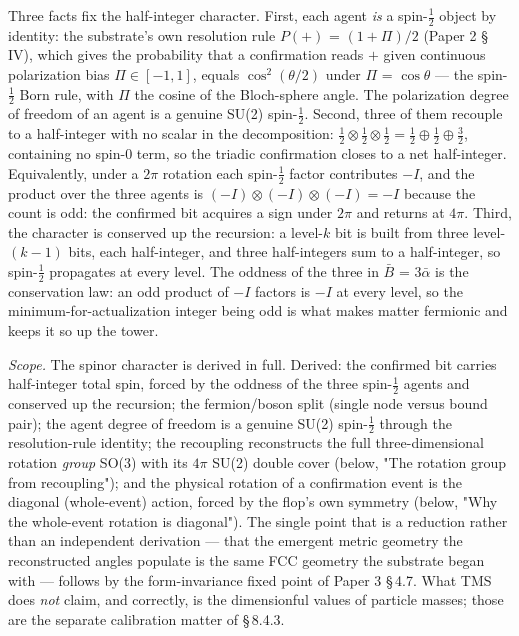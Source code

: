 \documentclass[11pt,oneside]{report}
\theoremstyle{definition}
\theoremstyle{remark}
\begin{document}
Three facts fix the half-integer character. First, each agent \emph{is}
a spin-\ensuremath{\tfrac{1}{2}} object by identity: the substrate's own resolution rule
\ensuremath{P(+)} = \ensuremath{(1 + \Pi)/2} (Paper 2 \S\,IV), which gives the probability that a
confirmation reads \ensuremath{+} given continuous polarization bias
\ensuremath{\Pi \in [-1, 1]}, equals \ensuremath{\cos^2(\theta/2)} under \ensuremath{\Pi} = \ensuremath{\cos\theta} --- the
spin-\ensuremath{\tfrac{1}{2}} Born rule, with \ensuremath{\Pi} the cosine of the Bloch-sphere angle. The
polarization degree of freedom of an agent is a genuine SU(2) spin-\ensuremath{\tfrac{1}{2}}.
Second, three of them recouple to a half-integer with no scalar in the
decomposition: \ensuremath{\tfrac{1}{2} \otimes \tfrac{1}{2} \otimes \tfrac{1}{2} = \tfrac{1}{2} \oplus \tfrac{1}{2} \oplus \tfrac{3}{2}},
containing no spin-0 term, so the triadic confirmation closes to a net
half-integer. Equivalently, under a \ensuremath{2\pi} rotation each spin-\ensuremath{\tfrac{1}{2}} factor
contributes \ensuremath{-I}, and the product over the three agents is
\ensuremath{(-I)\otimes(-I)\otimes(-I) = -I} because the count is odd: the confirmed bit
acquires a sign under \ensuremath{2\pi} and returns at \ensuremath{4\pi}. Third, the character is
conserved up the recursion: a level-\ensuremath{k} bit is built from three
level-\ensuremath{(k-1)} bits, each half-integer, and three half-integers sum to a
half-integer, so spin-\ensuremath{\tfrac{1}{2}} propagates at every level. The oddness of the
three in \ensuremath{\bar{B}} = \ensuremath{3\bar{\alpha}} is the conservation law: an odd product of \ensuremath{-I}
factors is \ensuremath{-I} at every level, so the minimum-for-actualization integer
being odd is what makes matter fermionic and keeps it so up the tower.

\emph{Scope.} The spinor character is derived in full. Derived: the confirmed
bit carries half-integer total spin, forced by the oddness of the three
spin-\ensuremath{\tfrac{1}{2}} agents and conserved up the recursion; the fermion/boson split
(single node versus bound pair); the agent degree of freedom is a genuine SU(2)
spin-\ensuremath{\tfrac{1}{2}} through the resolution-rule identity; the recoupling reconstructs
the full three-dimensional rotation \emph{group} SO(3) with its \ensuremath{4\pi} SU(2)
double cover (below, "The rotation group from recoupling"); and the physical rotation of a confirmation event is
the diagonal (whole-event) action, forced by the flop's own symmetry
(below, "Why the whole-event rotation is diagonal"). The single point that is a reduction rather than an independent
derivation --- that the emergent metric geometry the reconstructed angles
populate is the same FCC geometry the substrate began with --- follows by the
form-invariance fixed point of Paper 3 \S\,4.7. What TMS does \emph{not} claim,
and correctly, is the dimensionful values of particle masses; those are the
separate calibration matter of \S\,8.4.3.
\end{document}
